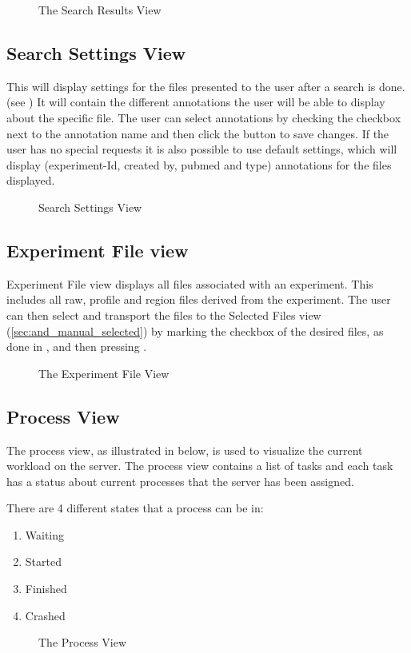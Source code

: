 \begin{figure}[h]
\caption{The Search Results View}
\label{fig:and_search_results_man} 
\end{figure}
\FloatBarrier


\subsection{Search Settings View}
This will display settings for the files presented to the user after a search is done.(see ) It will contain the different annotations the user will be able to display about the specific file. The user can select annotations by checking the checkbox next to the annotation name and then click the button to save changes. If the user has no special requests it is also possible to use default settings, which will display (experiment-Id, created by, pubmed and type) annotations for the files displayed. 

\begin{figure}[ht]
\caption{Search Settings View}
\label{fig:and_search_settings}
\end{figure}
\FloatBarrier


\subsection{Experiment File view}
Experiment File view displays all files associated with an experiment. This includes all raw, profile and region files derived from the experiment. The user can then select and transport the files to the Selected Files view (\ref{sec:and_manual_selected}) by marking the checkbox of the desired files, as done in  , and then pressing .

\begin{figure}[h]
\caption{ The Experiment File View}
\label{fig:and_experiment_man}
\end{figure}
\FloatBarrier


\subsection{Process View}
The process view, as illustrated in  below, is used to visualize the current workload on the server. The process view contains a list of tasks and each task has a status about current processes that the server has been assigned.

There are 4 different states that a process can be in:
\begin{enumerate}
\item{Waiting}
\item{Started}
\item{Finished}
\item{Crashed}
\end{enumerate}

\begin{figure}[h]
\caption{ The Process View}
\label{fig:and_process_man}
\end{figure}
\FloatBarrier






